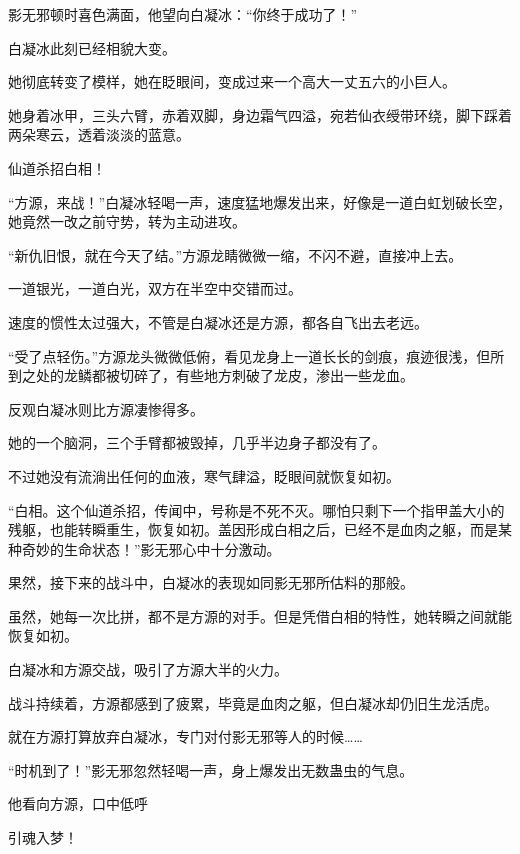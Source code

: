 \begin{this_body}
影无邪顿时喜色满面，他望向白凝冰：“你终于成功了！”

白凝冰此刻已经相貌大变。

她彻底转变了模样，她在眨眼间，变成过来一个高大一丈五六的小巨人。

她身着冰甲，三头六臂，赤着双脚，身边霜气四溢，宛若仙衣绶带环绕，脚下踩着两朵寒云，透着淡淡的蓝意。

仙道杀招白相！

“方源，来战！”白凝冰轻喝一声，速度猛地爆发出来，好像是一道白虹划破长空，她竟然一改之前守势，转为主动进攻。

“新仇旧恨，就在今天了结。”方源龙睛微微一缩，不闪不避，直接冲上去。

一道银光，一道白光，双方在半空中交错而过。

速度的惯性太过强大，不管是白凝冰还是方源，都各自飞出去老远。

“受了点轻伤。”方源龙头微微低俯，看见龙身上一道长长的剑痕，痕迹很浅，但所到之处的龙鳞都被切碎了，有些地方刺破了龙皮，渗出一些龙血。

反观白凝冰则比方源凄惨得多。

她的一个脑洞，三个手臂都被毁掉，几乎半边身子都没有了。

不过她没有流淌出任何的血液，寒气肆溢，眨眼间就恢复如初。

“白相。这个仙道杀招，传闻中，号称是不死不灭。哪怕只剩下一个指甲盖大小的残躯，也能转瞬重生，恢复如初。盖因形成白相之后，已经不是血肉之躯，而是某种奇妙的生命状态！”影无邪心中十分激动。

果然，接下来的战斗中，白凝冰的表现如同影无邪所估料的那般。

虽然，她每一次比拼，都不是方源的对手。但是凭借白相的特性，她转瞬之间就能恢复如初。

白凝冰和方源交战，吸引了方源大半的火力。

战斗持续着，方源都感到了疲累，毕竟是血肉之躯，但白凝冰却仍旧生龙活虎。

就在方源打算放弃白凝冰，专门对付影无邪等人的时候……

“时机到了！”影无邪忽然轻喝一声，身上爆发出无数蛊虫的气息。

他看向方源，口中低呼

引魂入梦！

\end{this_body}

